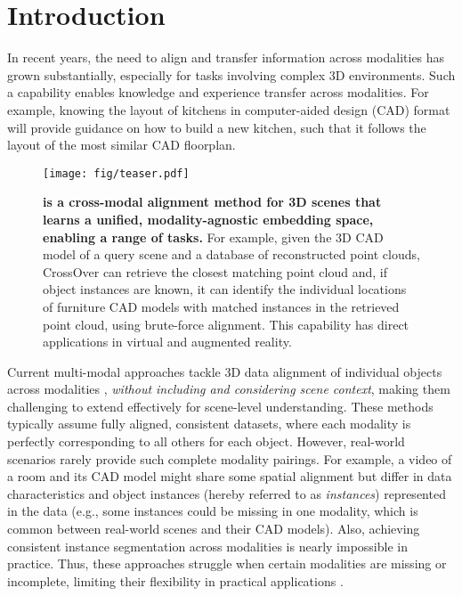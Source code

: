 \section{Introduction}
\label{sec:intro}   

In recent years, the need to align and transfer information across modalities has grown substantially, especially for tasks involving complex 3D environments. Such a capability enables knowledge and experience transfer across modalities. For example, knowing the layout of kitchens in computer-aided design (CAD) format will provide guidance on how to build a new kitchen, such that it follows the layout of the most similar CAD floorplan.


\begin{figure}
    \texttt{[image: fig/teaser.pdf]}%
    \caption{\textbf{\textit{\project{}} is a cross-modal alignment method for 3D scenes that learns a unified, modality-agnostic embedding space, enabling a range of tasks.} For example, given the 3D CAD model of a query scene and a database of reconstructed point clouds, CrossOver can retrieve the closest matching point cloud and, if object instances are known, it can identify the individual locations of furniture CAD models with matched instances in the retrieved point cloud, using brute-force alignment. This capability has direct applications in virtual and augmented reality.}
    \label{fig:teaser}
\end{figure} 

Current multi-modal approaches tackle 3D data alignment of individual objects across modalities \cite{zhang2021pointclip,xue2022ulip,xue2023ulip2,pointbind}, \textit{without including and considering scene context}, making them challenging to extend effectively for scene-level understanding. These methods typically assume fully aligned, consistent datasets, where each modality is perfectly corresponding to all others for each object. However, real-world scenarios rarely provide such complete modality pairings. For example, a video of a room and its CAD model might share some spatial alignment but differ in data characteristics and object instances (hereby referred to as \textit{instances}) represented in the data (e.g., some instances could be missing in one modality, which is common between real-world scenes and their CAD models). Also, achieving consistent instance segmentation across modalities is nearly impossible in practice. Thus, these approaches struggle when certain modalities are missing or incomplete, limiting their flexibility in practical applications \cite{baltruvsaitis2018multimodal}.



